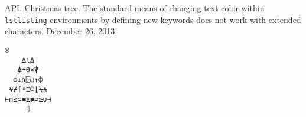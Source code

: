 \documentclass{article}
\begin{document}
\Large

APL Christmas tree. The standard means of changing text color within
\texttt{lstlisting} environments by defining new keywords does not work with
extended characters. December 26, 2013.

\vspace{1.5cm}

\begin{minipage}{0.41\linewidth}
\centering
\begin{lstlisting}[language=apl,basicstyle=\ttfamily\Huge\color{PineGreen},
frame=shadowbox,framexleftmargin=10mm]
     ⍟
    ∆⍳⍙
   ⍋÷⍬×⍒
  ⊖↓⍺⌹⍵↑⌽
 ⍱⌿⌈⍤⌶⍥⌊⍀⍲
⊢∩≤⊂≡⍎≢⊃≥∪⊣
     ⌷
\end{lstlisting}
\end{minipage}
\end{document}
